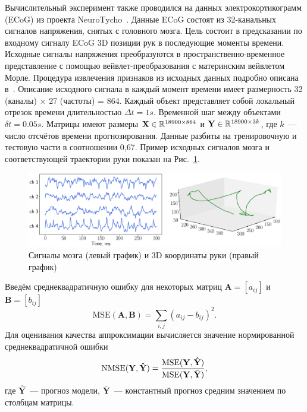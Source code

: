 Вычислительный эксперимент также проводился на данных электрокортикограмм (ECoG) из проекта NeuroTycho~\cite{shimoda2012decoding}.
Данные ECoG состоят из 32-канальных сигналов напряжения, снятых с головного мозга.
Цель состоит в предсказании по входному сигналу ECoG 3D позиции рук в последующие моменты времени.
Исходные сигналы напряжения преобразуются в пространственно-временное представление с помощью вейвлет-преобразования с материнским вейвлетом Морле.
Процедура извлечения признаков из исходных данных подробно описана в~\cite{chao2010long,eliseyev2016penalized}.
Описание исходного сигнала в каждый момент времени имеет размерность 32 (каналы) $\times $ 27 (частоты) = 864.
Каждый объект представляет собой локальный отрезок времени длительностью $\Delta t = 1s$. 
Временной шаг между объектами $\delta t = 0.05 s$.
Матрицы имеют размеры $\mathbf{X} \in \mathbb{R}^{18900 \times 864}$ и $\mathbf{Y} \in \mathbb{R}^{18900 \times 3k}$, где $k$~--- число отсчётов времени прогнозирования.
Данные разбиты на тренировочную и тестовую части в соотношении 0,67. 
Пример исходных сигналов мозга и соответствующей траектории руки показан на Рис.~\ref{ch2:fig:ecog_data}.

\begin{figure}[ht]
	\centering
	\includegraphics[width=\linewidth]{figs/ch2/ecog_data}
	\caption{Сигналы мозга (левый график) и 3D координаты руки (правый график)}
	\label{ch2:fig:ecog_data}
\end{figure}

Введём среднеквадратичную ошибку для некоторых матриц $\mathbf{A} = [a_{ij}]$ и $\mathbf{B} = [b_{ij}]$
\[
	\text{MSE} (\mathbf{A}, \mathbf{B}) = \sum_{i,j} (a_{ij} - b_{ij})^2.
\]
Для оценивания качества аппроксимации вычисляется значение нормированной среднеквадратичной ошибки
\begin{equation}
	\text{NMSE}(\mathbf{Y},  \mathbf{\hat{Y}}) = \frac{\text{MSE} (\mathbf{Y}, \mathbf{\hat{Y}})}{\text{MSE} (\mathbf{Y}, \mathbf{\bar{Y}})},
	\label{ch2:eq:nmse}
\end{equation}
где $\mathbf{\hat{Y}}$~--- прогноз модели, $\mathbf{\bar{Y}}$~--- константный прогноз средним значением по столбцам матрицы.


